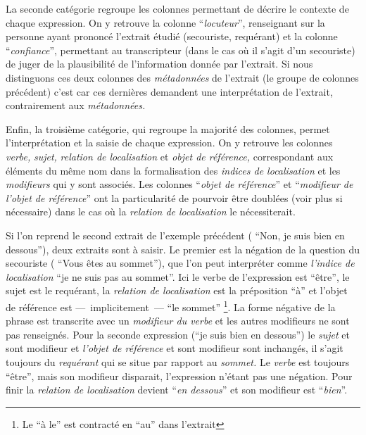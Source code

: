 La seconde catégorie regroupe les colonnes permettant de décrire le
contexte de chaque expression. On y retrouve la colonne
\enquote{\emph{locuteur}}, renseignant sur la personne ayant prononcé
l'extrait étudié (\eg secouriste, requérant) et la colonne
\enquote{\emph{confiance}}, permettant au transcripteur (dans le cas
où il s'agit d'un secouriste) de juger de la plausibilité de
l'information donnée par l'extrait. Si nous distinguons ces deux
colonnes des \emph{métadonnées} de l'extrait (\ie le groupe de
colonnes précédent) c'est car ces dernières demandent une
interprétation de l'extrait, contrairement aux \emph{métadonnées.}

Enfin, la troisième catégorie, qui regroupe la majorité des colonnes,
permet l'interprétation et la saisie de chaque expression. On y
retrouve les colonnes \emph{verbe,} \emph{sujet,} \emph{relation de
  localisation} et \emph{objet de référence,} correspondant aux
éléments du même nom dans la formalisation des \emph{indices de
  localisation} et les \emph{modifieurs} qui y sont associés. Les
colonnes \enquote{\emph{objet de référence}} et
\enquote{\emph{modifieur de l'objet de référence}} ont la
particularité de pourvoir être doublées (voir plus si nécessaire) dans
le cas où la \emph{relation de localisation} le nécessiterait.

Si l'on reprend le second extrait de l'exemple précédent (\ie
\enquote{Non, je suis bien en dessous}), deux extraits sont à
saisir. Le premier est la négation de la question du secouriste (\ie
\enquote{Vous êtes au sommet}), que l'on peut interpréter comme
\emph{l'indice de localisation} \enquote{je ne suis pas au
  sommet}. Ici le verbe de l'expression est \enquote{être}, le sujet
est le requérant, la \emph{relation de localisation} est la
préposition \enquote{à} et l'objet de référence est
---~implicitement~--- \enquote{le sommet} \footnote{Le \enquote{à le}
  est contracté en \enquote{au} dans l'extrait}. La forme négative de
la phrase est transcrite avec un \emph{modifieur du verbe} et les
autres modifieurs ne sont pas renseignés. Pour la seconde expression
(\ie \enquote{je suis bien en dessous}) le \emph{sujet} et sont
modifieur et \emph{l'objet de référence} et sont modifieur sont
inchangés, il s'agit toujours du \emph{requérant} qui se situe par
rapport au \emph{sommet.} Le \emph{verbe} est toujours \enquote{être},
mais son modifieur disparait, l'expression n'étant pas une
négation. Pour finir la \emph{relation de localisation} devient
\enquote{\emph{en dessous}} et son modifieur est
\enquote{\emph{bien}}.

